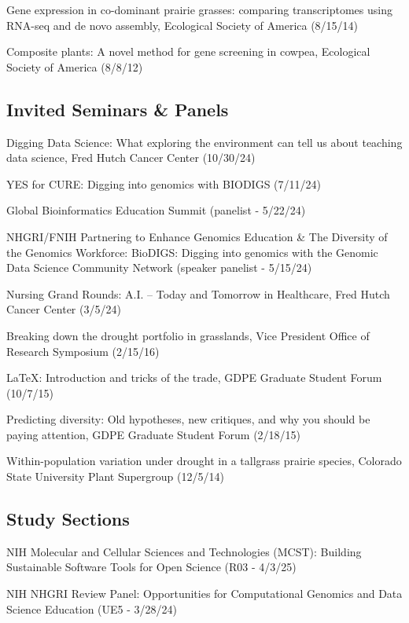 \documentclass{cv}
\begin{document}
Gene expression in co-dominant prairie grasses: comparing transcriptomes using RNA-seq and de novo assembly, Ecological Society of America (8/15/14)

Composite plants: A novel method for gene screening in cowpea, Ecological Society of America (8/8/12)

\subsection*{Invited Seminars \& Panels}

Digging Data Science: What exploring the environment can tell us about teaching data science, Fred Hutch Cancer Center (10/30/24)

YES for CURE: Digging into genomics with BIODIGS (7/11/24)

Global Bioinformatics Education Summit (panelist - 5/22/24) %

NHGRI/FNIH Partnering to Enhance Genomics Education \& The Diversity of the Genomics Workforce: BioDIGS: Digging into genomics with the Genomic Data Science Community Network (speaker panelist - 5/15/24)

Nursing Grand Rounds: A.I. – Today and Tomorrow in Healthcare, Fred Hutch Cancer Center (3/5/24)

Breaking down the drought portfolio in grasslands, Vice President Office of Research Symposium (2/15/16)

\LaTeX: Introduction and tricks of the trade, GDPE Graduate Student Forum (10/7/15)

Predicting diversity: Old hypotheses, new critiques, and why you should be paying attention, GDPE Graduate Student Forum (2/18/15)

Within-population variation under drought in a tallgrass prairie species, Colorado State University Plant Supergroup (12/5/14)

\subsection*{Study Sections}

NIH Molecular and Cellular Sciences and Technologies (MCST): Building Sustainable Software Tools for Open Science (R03 - 4/3/25)

NIH NHGRI Review Panel: Opportunities for Computational Genomics and Data Science Education (UE5 - 3/28/24)

\end{document}
